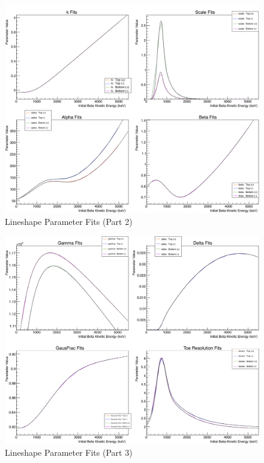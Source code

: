 \begin{figure}[h!!tb]
	\centering
	\includegraphics[width=.999\linewidth]
	{Figures/LineshapeParams_part2.png}
	\caption[Lineshape Parameter Fits (Part 2)]{Lineshape Parameter Fits (Part 2)}	
\end{figure}

\begin{figure}[h!!tb]
	\centering
	\includegraphics[width=.999\linewidth]
	{Figures/LineshapeParams_part3.png}
	\caption[Lineshape Parameter Fits (Part 3)]{Lineshape Parameter Fits (Part 3)}	
\end{figure}

